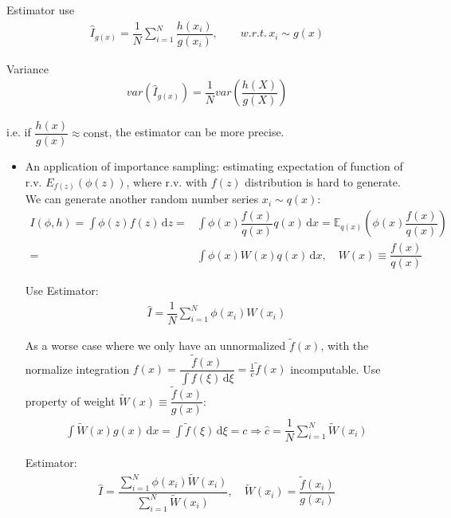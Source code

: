     Estimator use 
    \begin{align}
        \hat{I}_{g(x)}=\dfrac{1}{N}\sum_{i=1}^N\dfrac{h(x_i)}{g(x_i)},\qquad w.r.t. \,x_i\sim g(x)
    \end{align}

    Variance
    \begin{align}
        var(\hat{I}_{g(x)})=\dfrac{1}{N}var\left(\dfrac{h(X)}{g(X)}\right) 
    \end{align}
    
    i.e. if $ \dfrac{h(x)}{g(x)}\approx \mathrm{const} $, the estimator can be more precise.

    \begin{itemize}[topsep=2pt,itemsep=0pt]
        \item An application of importance sampling: estimating expectation of function of r.v. $ E_{f(z)}\left(\phi(z)\right) $, where r.v. with $ f(z) $ distribution is hard to generate. We can generate another random number series $ x_i\sim q(x) $:
        \begin{align}
            I(\phi,h)=\int \phi(z)f(z) \,\mathrm{d}z =&\int \phi(x)\dfrac{f(x)}{q(x)}q(x) \,\mathrm{d}x=\mathbb{E}_{q(x)}\left(\phi(x)\dfrac{f(x)}{q(x)}\right)\\
            =&\int \phi(x)W(x)q(x) \,\mathrm{d}x,\quad W(x)\equiv\dfrac{f(x)}{q(x)}
        \end{align}
    
        Use Estimator:
        \begin{align}
            \hat{I}=\dfrac{1}{N}\sum_{i=1}^N\phi(x_i)W(x_i) 
        \end{align}

        As a worse case where we only have an unnormalized $ \tilde{f}(x) $, with the normalize integration $ f(x)=\dfrac{\tilde{f}(x)}{\int f(\xi ) \,\mathrm{d}\xi }=\frac{1}{c}\tilde{f}(x) $ incomputable. Use property of weight $ \tilde{W}(x)\equiv\dfrac{\tilde{f}(x)}{g(x)} $:
        \begin{align}
            \int \tilde{W}(x)g(x) \,\mathrm{d}x= \int \tilde{f}(\xi ) \,\mathrm{d}\xi=c \Rightarrow \hat{c}=\dfrac{1}{N}\sum_{i=1}^N\tilde{W}(x_i)
        \end{align}
        
        Estimator:
        \begin{align}
            \hat{I}=\dfrac{\sum_{i=1}^N\phi(x_i)\tilde{W}(x_i)}{\sum_{i=1}^N\tilde{W}(x_i)} ,\quad \tilde{W}(x_i)=\dfrac{\tilde{f}(x_i)}{g(x_i)}
        \end{align}
        
    \end{itemize}
    
